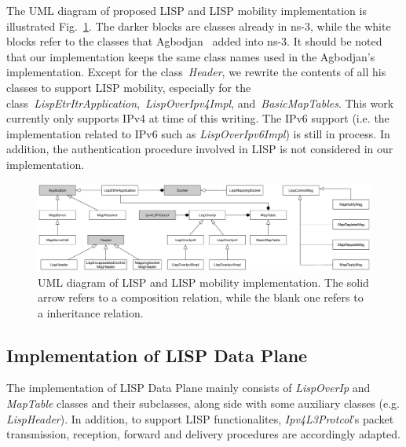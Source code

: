 The UML diagram of proposed LISP and LISP mobility implementation is illustrated Fig.~\ref{LISP_UML}. The darker blocks are classes already in ns-3, while the white blocks refer to the classes that Agbodjan~\cite{lionel2016} added into ns-3. It should be noted that our implementation keeps the same class names used in the Agbodjan's implementation. Except for the class~\emph{Header}, we rewrite the contents of all his classes to support LISP mobility, especially for the  class~\emph{LispEtrItrApplication},~\emph{LispOverIpv4Impl}, and~\emph{BasicMapTables}. %
This work currently only supports IPv4 at time of this writing. The IPv6 support (i.e. the implementation related to IPv6 such as \emph{LispOverIpv6Impl}) is still in process. In addition, the authentication procedure involved in LISP is not considered in our implementation.%
\begin{figure}[!t]
	\centering
	\includegraphics[width=\textwidth]{Pics/LISP_NS3_UML}
	\caption{UML diagram of LISP and LISP mobility implementation. The solid arrow refers to a composition relation, while the blank one refers to a inheritance relation.}
	\label{LISP_UML}
\end{figure}
\subsection{Implementation of LISP Data Plane}
\label{subsec:modifyInternet}
The implementation of LISP Data Plane mainly consists of \emph{LispOverIp} and \emph{MapTable} classes and their subclasses, along side with some auxiliary classes (e.g. \emph{LispHeader}). In addition, to support LISP functionalites, \emph{Ipv4L3Protcol}'s packet transmission, reception, forward and delivery procedures are accordingly adapted.
